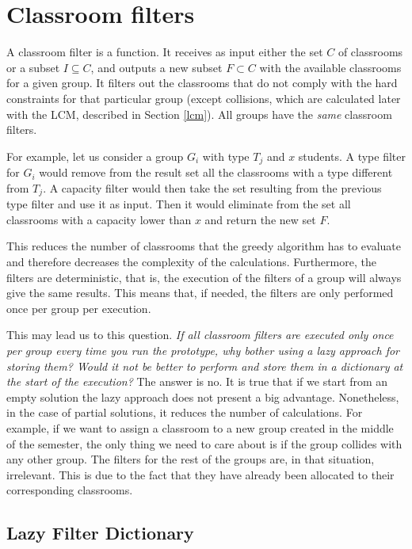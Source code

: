 \section{Classroom filters}\label{classroom-filters}

A classroom filter is a function. It receives as input either the set $C$ of classrooms or a subset $I \subseteq C$, and outputs a new subset $F \subset C$ with the available classrooms for a given group. It filters out the classrooms that do not comply with the hard constraints for that particular group (except collisions, which are calculated later with the LCM, described in Section \ref{lcm}). All groups have the \textit{same} classroom filters.

For example, let us consider a group $G_{i}$ with type $T_{j}$ and $x$ students. A type filter for $G_{i}$ would remove from the result set all the classrooms with a type different from $T_{j}$. A capacity filter would then take the  set resulting from the previous type filter and use it as input. Then it would eliminate from the set all classrooms with a capacity lower than $x$ and return the new set $F$.

This reduces the number of classrooms that the greedy algorithm has to evaluate and therefore decreases the complexity of the calculations. Furthermore, the filters are deterministic, that is, the execution of the filters of a group will always give the same results. This means that, if needed, the filters are only performed once per group per execution.

This may lead us to this question. \textit{If all classroom filters are executed only once per group every time you run the prototype, why bother using a lazy approach for storing them? Would it not be better to perform and store them in a dictionary at the start of the execution?} The answer is no. It is true that if we start from an empty solution the lazy approach does not present a big advantage. Nonetheless, in the case of partial solutions, it reduces the number of calculations. For example, if we want to assign a classroom to a new group created in the middle of the semester, the only thing we need to care about is if the group collides with any other group. The filters for the rest of the groups are, in that situation, irrelevant. This is due to the fact that they have already been allocated to their corresponding classrooms.


\subsection{Lazy Filter Dictionary}\label{lfd}


